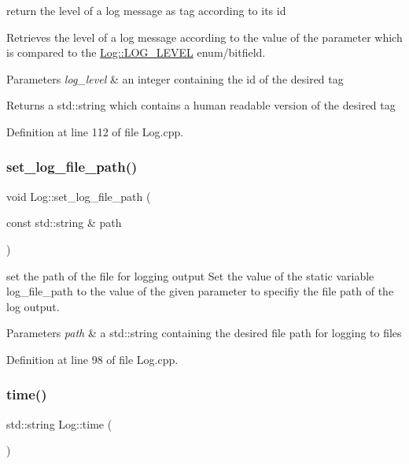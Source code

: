 return the level of a log message as tag according to its id 

Retrieves the level of a log message according to the value of the parameter which is compared to the \mbox{\hyperlink{class_log_ad671761fe5e2e030871610bd6dfecd79}{Log\+::\+L\+O\+G\+\_\+\+L\+E\+V\+EL}} enum/bitfield.


\begin{DoxyParams}{Parameters}
{\em log\+\_\+level} & an integer containing the id of the desired tag\\
\hline
\end{DoxyParams}
\begin{DoxyReturn}{Returns}
a std\+::string which contains a human readable version of the desired tag 
\end{DoxyReturn}


Definition at line 112 of file Log.\+cpp.

\mbox{\label{class_log_afa51df02f0cc80fbab4530930440129b}} 
\subsubsection{\texorpdfstring{set\_log\_file\_path()}{set\_log\_file\_path()}}
{\footnotesize\ttfamily void Log\+::set\+\_\+log\+\_\+file\+\_\+path (\begin{DoxyParamCaption}\item[{const std\+::string \&}]{path }\end{DoxyParamCaption})\hspace{0.3cm}{\ttfamily [static]}}

set the path of the file for logging output Set the value of the static variable log\+\_\+file\+\_\+path to the value of the given parameter to specifiy the file path of the log output.


\begin{DoxyParams}{Parameters}
{\em path} & a std\+::string containing the desired file path for logging to files \\
\hline
\end{DoxyParams}


Definition at line 98 of file Log.\+cpp.

\mbox{\label{class_log_a65958a4fb560f3e666be0045e312a1b6}} 
\subsubsection{\texorpdfstring{time()}{time()}}
{\footnotesize\ttfamily std\+::string Log\+::time (\begin{DoxyParamCaption}{ }\end{DoxyParamCaption})\hspace{0.3cm}{\ttfamily [static]}}



